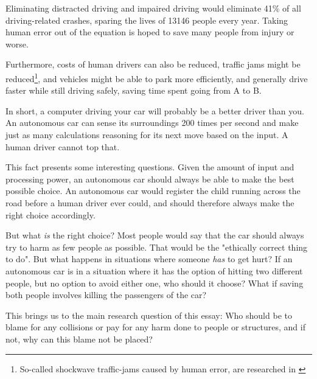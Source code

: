 Eliminating distracted driving and impaired driving would eliminate 41\% of all driving-related crashes, sparing the lives of 13146 people every year. Taking human error out of the equation is hoped to save many people from injury or worse.  

Furthermore, costs of human drivers can also be reduced, traffic jams might be reduced\footnote{So-called shockwave traffic-jams caused by human error, are researched in \cite{1367-2630-10-3-033001}}, and vehicles might be able to park more efficiently, and generally drive faster while still driving safely, saving time spent going from A to B. 

\newpar In short, a computer driving your car will probably be a better driver than you. An autonomous car can sense its surroundings 200 times per second and make just as many calculations reasoning for its next move based on the input. A human driver cannot top that. \cite{audirace}

This fact presents some interesting questions. Given the amount of input and processing power, an autonomous car should always be able to make the best possible choice. An autonomous car would register the child running across the road before a human driver ever could, and should therefore always make the right choice accordingly. 

\newpar But what \textit{is} the right choice? Most people would say that the car should always try to harm as few people as possible. That would be the "ethically correct thing to do". \cite{DBLP:journals/corr/BonnefonSR15} But what happens in situations where someone \textit{has} to get hurt? If an autonomous car is in a situation where it has the option of hitting two different people, but no option to avoid either one, who should it choose? What if saving both people involves killing the passengers of the car? 

This brings us to the main research question of this essay: Who should be to blame for any collisions or pay for any harm done to people or structures, and if not, why can this blame not be placed? 